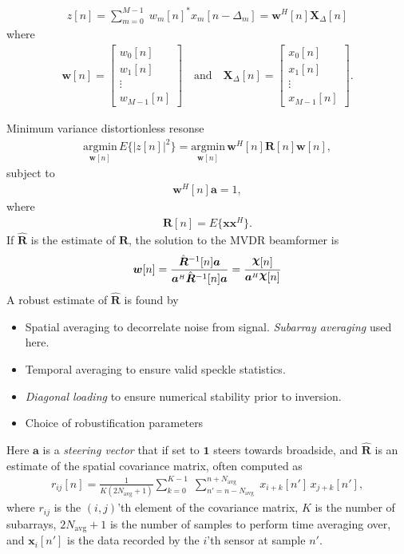 \documentclass[10pt,journal,draftclsnofoot,onecolumn]{IEEEtran}
\newcommand\bmat[1]{\begin{bmatrix}#1\end{bmatrix}}
\newcommand\argmin[1]{\text{arg}\;\underset{#1}{\text{min}}}
\newcommand\sumb[2]{\sum\limits_{#1}^{#2}\;}
\renewcommand\H{^{\scriptscriptstyle H}}
\renewcommand\vec[1]{\boldsymbol{#1}}
\newcommand\mat[1]{\boldsymbol{#1}}
\newcommand\1{\vec 1}
\renewcommand*\a{\vec a}
\newcommand*\w{\vec w}
\newcommand*\x{\vec x}
\newcommand*\R{\mat R}
\newcommand*\eR{\mat{\hat R}}
\newcommand*\X{\mat X}
\newcommand*\Xd{\X_{\!\Delta}}
\renewcommand\argmin{\text{argmin}}
\begin{document}
\begin{align}
z[n] = \sumb{m=0}{M-1} w_m[n]^*x_m[n-\Delta_m] = \w\H[n]\Xd[n]
\end{align}
where
\begin{align}
\w[n] = \bmat{w_0[n]\\w_1[n]\\\vdots\\w_{M-1}[n]} \quad \text{and} \quad\Xd[n] = \bmat{x_0[n]\\x_1[n]\\\vdots\\x_{M-1}[n]}.
\end{align}

Minimum variance distortionless resonse \cite{Capon1969}
\begin{align}
\underset{\w[n]}{\argmin}\, E\{ |z[n]|^2 \} = \underset{\w[n]}{\argmin}\, \w\H[n]\R[n]\w[n], 
\end{align}
subject to
\begin{align}
\w\H[n]\a = 1,
\end{align}
where
\begin{align}
\R[n] = E\{ \x\x\H \}.
\end{align}
If $\eR$ is the estimate of $\R$, the solution to the MVDR beamformer is
\begin{gather*}
\vec w[n] = \frac{\hat{\mat R}\,\!^{-1}[n]\vec a}{\vec a\H\hat{\mat R}\,\!^{-1}[n]\vec a} = \frac{\text{\raisebox{1.9pt}{$\vec\chi$}}[n]}{\vec a\H\text{\raisebox{1.9pt}{$\vec\chi$}}[n]}
\end{gather*}
A robust estimate of $\eR$ is found by
\begin{itemize}
\item Spatial averaging to decorrelate noise from signal. \emph{Subarray averaging} used here.
\item Temporal averaging to ensure valid speckle statistics.
\item \emph{Diagonal loading} to ensure  numerical stability prior to inversion.
\item Choice of robustification parameters \cite{Synnevag2007}
\end{itemize}

Here $\vec a$ is a \emph{steering vector} that if set to $\vec 1$ steers towards broadside, and $\hat{\mat R}$ is an estimate of the spatial covariance matrix, often computed as
\begin{gather*}
r_{ij}[n] = \frac{1}{K(2N_{\text{avg}}+1)}\sumb{k=0}{K-1} \sumb{n'=n-N_{\text{avg}}}{n+N_{\text{avg}}} x_{i+k}[n']\,x_{j+k}[n'],
\end{gather*}
where $r_{ij}$ is the $(i,j)$'th element of the covariance matrix, $K$ is the number of subarrays, $2N_{\text{avg}}+1$ is the number of samples to perform time averaging over, and $\vec x_i[n']$ is the data recorded by the $i$'th sensor at sample $n'$. 
\end{document}

